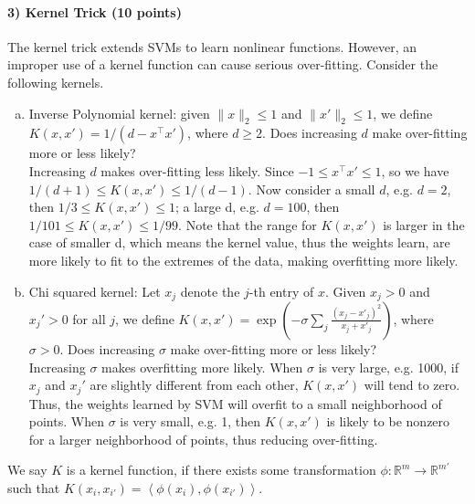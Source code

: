 \documentclass[11pt]{article}
\begin{document}
\paragraph{3) Kernel Trick (10 points)}
The kernel trick extends SVMs to learn nonlinear functions. However, an improper use of a kernel function can cause serious over-fitting. Consider the following kernels.
\begin{enumerate}[(a)]
\item Inverse Polynomial kernel: given $\|x\|_2\leq 1$ and $\|x'\|_2\leq 1$, we define $K(x, x') = 1/(d-x^\top x')$, where $d\geq 2$. Does increasing $d$ make over-fitting more or less likely?\\

Increasing $d$ makes over-fitting less likely. Since $-1 \leq x^\top x' \leq 1$, so we have $1/(d+1) \leq K(x, x') \leq 1/(d-1)$. Now consider a small $d$, e.g. $d = 2$, then $1/3 \leq K(x, x') \leq 1$; a large d, e.g. $d = 100$, then $1/101 \leq K(x, x') \leq 1/99$. Note that the range for $K(x, x')$ is larger in the case of smaller d, which means the kernel value, thus the weights learn, are more likely to fit to the extremes of the data, making overfitting more likely.


\item Chi squared kernel: Let $x_j$ denote the $j$-th entry of $x$. Given $x_j>0$ and $x_j'>0$ for all $j$, we define $K(x, x') = \exp\left(-\sigma\sum_j\frac{(x_j-x'_j)^2}{x_j+x'_j}\right)$, where $\sigma>0$. Does increasing $\sigma$ make over-fitting more or less likely?\\

Increasing $\sigma$ makes overfitting more likely. When $\sigma$ is very large, e.g. 1000, if $x_j$ and $x_j'$ are slightly different from each other, $K(x, x')$ will tend to zero. Thus, the weights learned by SVM will overfit to a small neighborhood of points. When $\sigma$ is very small, e.g. 1, then $K(x, x')$ is likely to be nonzero for a larger neighborhood of points, thus reducing over-fitting. 

\end{enumerate}
We say $K$ is a kernel function, if there exists some transformation $\phi:\mathbb{R}^m\rightarrow \mathbb{R}^{m'}$ such that $K(x_i,x_{i'}) = \left<\phi(x_i),\phi(x_{i'})\right>$.
\end{document}
